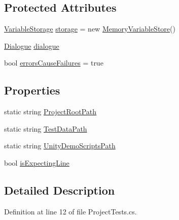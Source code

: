 \subsection*{Protected Attributes}
\begin{DoxyCompactItemize}
\item 
\hyperlink{a00169}{Variable\-Storage} \hyperlink{a00154_a23d59ace1516ca72924c6fe3feafd3f7}{storage} = new \hyperlink{a00130}{Memory\-Variable\-Store}()
\item 
\hyperlink{a00090}{Dialogue} \hyperlink{a00154_a4cff5de56c4b8a91c76b6eb2d622a795}{dialogue}
\item 
bool \hyperlink{a00154_ac978fe85db843c51411f5517bdbe0eb8}{errors\-Cause\-Failures} = true
\end{DoxyCompactItemize}
\subsection*{Properties}
\begin{DoxyCompactItemize}
\item 
static string \hyperlink{a00154_ab1ad614f465a49447da31c4000ec6b3e}{Project\-Root\-Path}
\item 
static string \hyperlink{a00154_aa9b4d902d61adad7165154a265f69aa4}{Test\-Data\-Path}
\item 
static string \hyperlink{a00154_a39922286f6255e4fd0e433a4fc7521c4}{Unity\-Demo\-Scripts\-Path}
\item 
bool \hyperlink{a00154_a47f35b8e8123ed9471883d02b8bc9f3e}{is\-Expecting\-Line}
\end{DoxyCompactItemize}


\subsection{Detailed Description}


Definition at line 12 of file Project\-Tests.\-cs.



